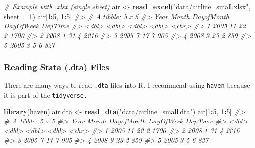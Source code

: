 \documentclass[]{book}
\newenvironment{Shaded}{\begin{snugshade}}{\end{snugshade}}
\newcommand{\CommentTok}[1]{\textcolor[rgb]{0.56,0.35,0.01}{\textit{#1}}}
\newcommand{\DataTypeTok}[1]{\textcolor[rgb]{0.13,0.29,0.53}{#1}}
\newcommand{\DecValTok}[1]{\textcolor[rgb]{0.00,0.00,0.81}{#1}}
\newcommand{\KeywordTok}[1]{\textcolor[rgb]{0.13,0.29,0.53}{\textbf{#1}}}
\newcommand{\NormalTok}[1]{#1}
\newcommand{\OperatorTok}[1]{\textcolor[rgb]{0.81,0.36,0.00}{\textbf{#1}}}
\newcommand{\StringTok}[1]{\textcolor[rgb]{0.31,0.60,0.02}{#1}}
\begin{document}
\begin{Shaded}
\begin{Highlighting}[]
\CommentTok{# Example with .xlsx (single sheet)}
\NormalTok{air <-}\StringTok{ }\KeywordTok{read_excel}\NormalTok{(}\StringTok{"data/airline_small.xlsx"}\NormalTok{, }\DataTypeTok{sheet =} \DecValTok{1}\NormalTok{) }
\NormalTok{air[}\DecValTok{1}\OperatorTok{:}\DecValTok{5}\NormalTok{, }\DecValTok{1}\OperatorTok{:}\DecValTok{5}\NormalTok{]}
\CommentTok{#> # A tibble: 5 x 5}
\CommentTok{#>    Year Month DayofMonth DayOfWeek DepTime}
\CommentTok{#>   <dbl> <dbl>      <dbl>     <dbl> <chr>  }
\CommentTok{#> 1  2005    11         22         2 1700   }
\CommentTok{#> 2  2008     1         31         4 2216   }
\CommentTok{#> 3  2005     7         17         7 905    }
\CommentTok{#> 4  2008     9         23         2 859    }
\CommentTok{#> 5  2005     3          5         6 827}
\end{Highlighting}
\end{Shaded}

\hypertarget{reading-stata-.dta-files}{%
\subsubsection*{Reading Stata (.dta) Files}\label{reading-stata-.dta-files}}

There are many ways to read \texttt{.dta} files into R. I recommend using \texttt{haven} because it is part of the \texttt{tidyverse.}

\begin{Shaded}
\begin{Highlighting}[]
\KeywordTok{library}\NormalTok{(haven)}
\NormalTok{air.dta <-}\StringTok{ }\KeywordTok{read_dta}\NormalTok{(}\StringTok{"data/airline_small.dta"}\NormalTok{) }
\NormalTok{air[}\DecValTok{1}\OperatorTok{:}\DecValTok{5}\NormalTok{, }\DecValTok{1}\OperatorTok{:}\DecValTok{5}\NormalTok{]}
\CommentTok{#> # A tibble: 5 x 5}
\CommentTok{#>    Year Month DayofMonth DayOfWeek DepTime}
\CommentTok{#>   <dbl> <dbl>      <dbl>     <dbl> <chr>  }
\CommentTok{#> 1  2005    11         22         2 1700   }
\CommentTok{#> 2  2008     1         31         4 2216   }
\CommentTok{#> 3  2005     7         17         7 905    }
\CommentTok{#> 4  2008     9         23         2 859    }
\CommentTok{#> 5  2005     3          5         6 827}
\end{Highlighting}
\end{Shaded}
\end{document}
